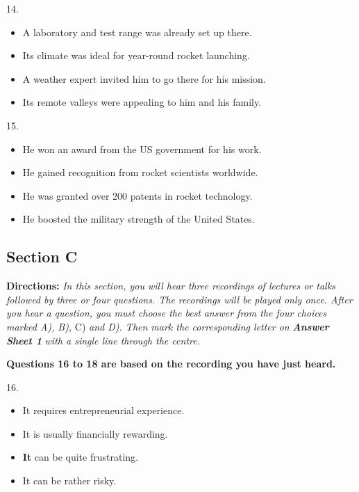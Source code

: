 \documentclass[UTF8,11pt]{ctexart}
\begin{document}
14.


\begin{itemize}[leftmargin=2em,itemsep=.2em,topsep=.4em]\item[A.] A laboratory and test range was already set up there.
\item[B.] Its climate was ideal for year-round rocket launching.
\item[C.] A weather expert invited him to go there for his mission.
\item[D.] Its remote valleys were appealing to him and his family.
\end{itemize}

15.


\begin{itemize}[leftmargin=2em,itemsep=.2em,topsep=.4em]\item[A.] He won an award from the US government for his work.
\item[B.] He gained recognition from rocket scientists worldwide.
\item[C.] He was granted over 200 patents in rocket technology.
\item[D.] He boosted the military strength of the United States.
\end{itemize}

\subsection*{\textbf{Section C}}


\textbf{Directions: }\textit{In this section, you will hear three recordings of lectures or talks followed by three or four} \textit{questions. The recordings will be played only once. After you hear a question, you must choose the best} \textit{answer from the four choices marked A), B), }C) \textit{and D). Then mark the corresponding letter on }\textbf{\textit{Answer}} \textbf{\textit{Sheet 1 }}\textit{with a single line through the centre.}


\textbf{Questions 16 to 18 are based on the recording you have just heard.}


16.


\begin{itemize}[leftmargin=2em,itemsep=.2em,topsep=.4em]\item[A.] It requires entrepreneurial experience.
\item[B.] It is usually financially rewarding.
\item[C.] \textbf{It }can be quite frustrating.
\item[D.] It can be rather risky.
\end{itemize}
\end{document}
